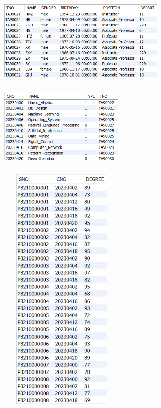 \documentclass{ctexart}
\begin{document}
		\begin{figure}[H]
			\centering 
			\includegraphics[height=4cm,width=8cm]{3.png}
			\end{figure}
			\begin{figure}[H]
				\centering 
				\includegraphics[height=4cm,width=6cm]{4.png}
				\end{figure}
				\begin{figure}[H]
					\centering 
					\includegraphics[height=12cm,width=6cm]{5.png}
					\end{figure}
\end{document}

